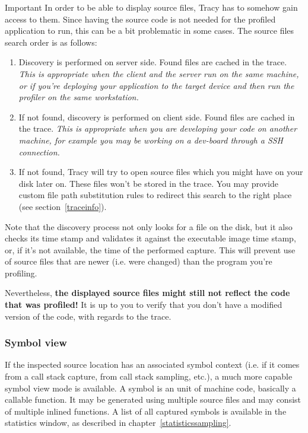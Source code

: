 \documentclass[hidelinks,titlepage,a4paper]{article}
\begin{document}
\begin{bclogo}[
noborder=true,
couleur=black!5,
logo=\bcbombe
]{Important}
In order to be able to display source files, Tracy has to somehow gain access to them. Since having the source code is not needed for the profiled application to run, this can be a bit problematic in some cases. The source files search order is as follows:

\begin{enumerate}
\item Discovery is performed on server side. Found files are cached in the trace. \emph{This is appropriate when the client and the server run on the same machine, or if you're deploying your application to the target device and then run the profiler on the same workstation.}
\item If not found, discovery is performed on client side. Found files are cached in the trace. \emph{This is appropriate when you are developing your code on another machine, for example you may be working on a dev-board through a SSH connection.}
\item If not found, Tracy will try to open source files which you might have on your disk later on. These files won't be stored in the trace. You may provide custom file path substitution rules to redirect this search to the right place (see section~\ref{traceinfo}).
\end{enumerate}

Note that the discovery process not only looks for a file on the disk, but it also checks its time stamp and validates it against the executable image time stamp, or, if it's not available, the time of the performed capture. This will prevent use of source files that are newer (i.e. were changed) than the program you're profiling.

Nevertheless, \textbf{the displayed source files might still not reflect the code that was profiled!} It is up to you to verify that you don't have a modified version of the code, with regards to the trace.
\end{bclogo}

\subsubsection{Symbol view}
\label{symbolview}

If the inspected source location has an associated symbol context (i.e. if it comes from a call stack capture, from call stack sampling, etc.), a much more capable symbol view mode is available. A symbol is an unit of machine code, basically a callable function. It may be generated using multiple source files and may consist of multiple inlined functions. A list of all captured symbols is available in the statistics window, as described in chapter~\ref{statisticssampling}.
\end{document}
